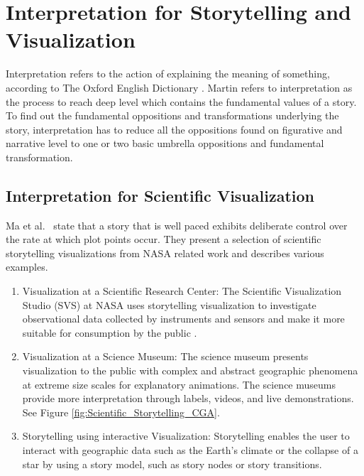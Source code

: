 \documentclass{egpubl}
\begin{document}
\section{Interpretation for Storytelling and Visualization}
Interpretation refers to the action of explaining the meaning of something, according to The Oxford English Dictionary \cite{Interpretation}. Martin\cite{Martin1997} refers to interpretation as the process to reach deep level which contains the fundamental values of a story.  To find out the fundamental oppositions and transformations underlying the story, interpretation has to reduce all the oppositions found on figurative and narrative level to one or two basic umbrella oppositions and fundamental transformation.


\subsection{Interpretation for Scientific Visualization}
Ma et al.\ \cite{sci} state that a story that is well paced exhibits deliberate control over the rate at which plot points occur.
They present a selection of scientific storytelling visualizations from NASA related work and describes various examples.
\begin{enumerate}
\item Visualization at a Scientific Research Center: The Scientific Visualization Studio (SVS) at NASA uses storytelling visualization to investigate observational data collected by instruments and sensors and make it more suitable for consumption by the public \cite{nasa}\cite{svs1}.
\item Visualization at a Science Museum: The science museum presents visualization to the public with complex and abstract geographic phenomena at extreme size scales for explanatory animations. The science museums provide more interpretation through labels, videos, and live demonstrations. See Figure \ref{fig:Scientific_Storytelling_CGA}\cite{sci}.
\item Storytelling using interactive Visualization: Storytelling enables the user to interact with geographic data such as the Earth's climate or the collapse of a star by using a story model, such as story nodes or story transitions\cite{Akiba}.
\end{enumerate}
\end{document}
